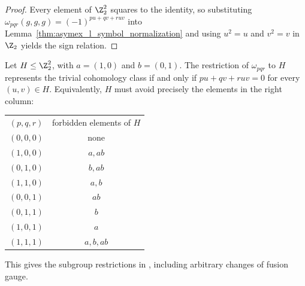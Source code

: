 \begin{proof}
    \leanok
    Every element of $\Z_2^2$ squares to the identity, so substituting
    $\omega_{pqr}(g,g,g)=(-1)^{pu+qv+ruv}$ into
    Lemma~\ref{thm:asymex_l_symbol_normalization} and using $u^2=u$ and
    $v^2=v$ in $\Z_2$ yields the sign relation.
\end{proof}

\begin{lemma}
    \label{thm:asymex_klein_subgroup_table}
    \leanok
    Let $H\leq\Z_2^2$, with $a=(1,0)$ and $b=(0,1)$.
    The restriction of $\omega_{pqr}$ to $H$ represents the trivial
    cohomology class if and only if $pu+qv+ruv=0$ for every $(u,v)\in H$.
    Equivalently, $H$ must avoid precisely the elements in the right column:
    \begin{center}
        \begin{tabular}{c@{\qquad}c}
            $(p,q,r)$ & forbidden elements of $H$ \\[2pt]
            $(0,0,0)$ & none                      \\
            $(1,0,0)$ & $a,ab$                    \\
            $(0,1,0)$ & $b,ab$                    \\
            $(1,1,0)$ & $a,b$                     \\
            $(0,0,1)$ & $ab$                      \\
            $(0,1,1)$ & $b$                       \\
            $(1,0,1)$ & $a$                       \\
            $(1,1,1)$ & $a,b,ab$
        \end{tabular}
    \end{center}
    This gives the subgroup restrictions in
    \cite[Section~6]{GarreRubio2023MPOSym}, including arbitrary changes
    of fusion gauge.
\end{lemma}


